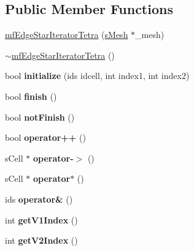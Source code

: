 \subsection*{Public Member Functions}
\begin{DoxyCompactItemize}
\item 
\hyperlink{classmf_1_1mfEdgeStarIteratorTetra_a74901b681190a2e930f4ce3c0df7b144}{mfEdgeStarIteratorTetra} (\hyperlink{classmf_1_1mfEdgeStarIteratorTetra_abbb7ca848037b976d69368943567397b}{sMesh} $\ast$\_\-mesh)
\item 
\hyperlink{classmf_1_1mfEdgeStarIteratorTetra_aa5af0640ad94c07a0ac86a8465cb3acf}{$\sim$mfEdgeStarIteratorTetra} ()
\item 
\hypertarget{classmf_1_1mfEdgeStarIteratorTetra_a12d177e0318a308de5cd640c144e5e32}{
bool {\bfseries initialize} (ids idcell, int index1, int index2)}
\label{classmf_1_1mfEdgeStarIteratorTetra_a12d177e0318a308de5cd640c144e5e32}

\item 
\hypertarget{classmf_1_1mfEdgeStarIteratorTetra_a52ebfd7ebca1f186f09ae3848dbe3d67}{
bool {\bfseries finish} ()}
\label{classmf_1_1mfEdgeStarIteratorTetra_a52ebfd7ebca1f186f09ae3848dbe3d67}

\item 
\hypertarget{classmf_1_1mfEdgeStarIteratorTetra_a6d4d34a65c49bc3ddd28150ab80280f9}{
bool {\bfseries notFinish} ()}
\label{classmf_1_1mfEdgeStarIteratorTetra_a6d4d34a65c49bc3ddd28150ab80280f9}

\item 
\hypertarget{classmf_1_1mfEdgeStarIteratorTetra_a0ab22331145fa1de75871913d7715025}{
bool {\bfseries operator++} ()}
\label{classmf_1_1mfEdgeStarIteratorTetra_a0ab22331145fa1de75871913d7715025}

\item 
\hypertarget{classmf_1_1mfEdgeStarIteratorTetra_a16ba2b3bd9f7ae2f9919addf1d637e46}{
sCell $\ast$ {\bfseries operator-\/$>$} ()}
\label{classmf_1_1mfEdgeStarIteratorTetra_a16ba2b3bd9f7ae2f9919addf1d637e46}

\item 
\hypertarget{classmf_1_1mfEdgeStarIteratorTetra_ab3f769b5de3b28d2fdd1fcaca2787e43}{
sCell $\ast$ {\bfseries operator$\ast$} ()}
\label{classmf_1_1mfEdgeStarIteratorTetra_ab3f769b5de3b28d2fdd1fcaca2787e43}

\item 
\hypertarget{classmf_1_1mfEdgeStarIteratorTetra_ad8b4e222f823e1dd6f394419b5eb2b61}{
ids {\bfseries operator\&} ()}
\label{classmf_1_1mfEdgeStarIteratorTetra_ad8b4e222f823e1dd6f394419b5eb2b61}

\item 
\hypertarget{classmf_1_1mfEdgeStarIteratorTetra_a0d0415bf2ff9a6b16607db1ba2bc1788}{
int {\bfseries getV1Index} ()}
\label{classmf_1_1mfEdgeStarIteratorTetra_a0d0415bf2ff9a6b16607db1ba2bc1788}

\item 
\hypertarget{classmf_1_1mfEdgeStarIteratorTetra_ab50da99eaf2bb0d293e48a7687bad9fd}{
int {\bfseries getV2Index} ()}
\label{classmf_1_1mfEdgeStarIteratorTetra_ab50da99eaf2bb0d293e48a7687bad9fd}

\end{DoxyCompactItemize}

